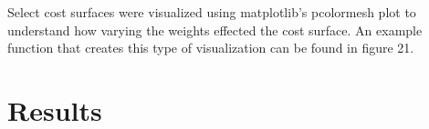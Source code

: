 \documentclass[article,12pt]{article}
\numberwithin{equation}{section}
\begin{document}
Select cost surfaces were visualized using matplotlib's pcolormesh plot to understand how varying the weights effected the cost surface. An example function that creates this type of visualization can be found in figure 21. 


\section{Results}
\end{document}
